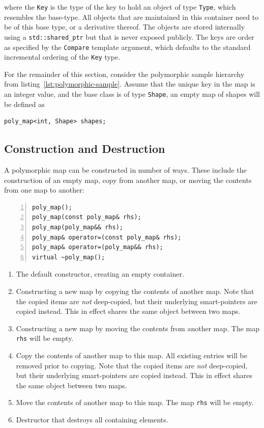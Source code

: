 \documentclass[10pt,a4paper,openany]{mudbook}
\newenvironment{enumeratedef}
  {\begin{enumerate}[topsep=0.5em,itemsep=0em,parsep=0em,font=\small]
     \small}
  {\end{enumerate}}
\begin{document}
where the \texttt{Key} is the type of the key to hold an object of type
\texttt{Type}, which resembles the base-type. All objects that are maintained
in this container need to be of this base type, or a derivative thereof.
The objects are stored internally using a \texttt{std::shared\_ptr} but that
is never exposed publicly. The keys are order as specified by the
\texttt{Compare} template argument, which defaults to the standard incremental
ordering of the \texttt{Key} type.

For the remainder of this section, consider the polymorphic sample hierarchy
from listing~\ref{lst:polymorphic-sample}. Assume that the unique key in the
map is an integer value, and the base class is of type \texttt{Shape}, an empty
map of shapes will be defined as

\begin{lstlisting}[style=snippet]
poly_map<int, Shape> shapes;
\end{lstlisting}

\subsection{Construction and Destruction}

A polymorphic map can be constructed in number of ways. These include the
construction of an empty map, copy from another map, or moving the
contents from one map to another:

\begin{lstlisting}[style=definition,numbers=left]
poly_map();
poly_map(const poly_map& rhs);
poly_map(poly_map&& rhs);
poly_map& operator=(const poly_map& rhs);
poly_map& operator=(poly_map&& rhs);
virtual ~poly_map();
\end{lstlisting}
\begin{enumeratedef}
  \item The default constructor, creating an empty container.
  \item Constructing a new map by copying the contents of another map.
        Note that the copied items are \emph{not} deep-copied, but their
        underlying smart-pointers are copied instead. This in effect shares
        the same object between two maps.
  \item Constructing a new map by moving the contents from another map.
        The map \texttt{rhs} will be empty.
  \item Copy the contents of another map to this map. All existing entries will
        be removed prior to copying. Note that the copied items are
        \emph{not} deep-copied, but their underlying smart-pointers are copied
        instead. This in effect shares the same object between two maps.
  \item Move the contents of another map to this map. The map
        \texttt{rhs} will be empty.
  \item Destructor that destroys all containing elements.
\end{enumeratedef}
\end{document}
